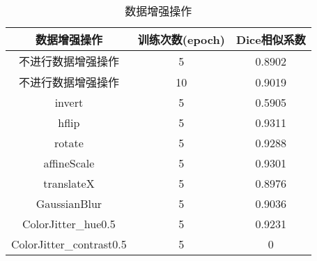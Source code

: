 \documentclass[AutoFakeBold]{LZUThesis}
\begin{document}
\begin{table}[htbp] %
    \setlength{\abovecaptionskip}{0cm}
    \setlength{\belowcaptionskip}{0.2cm}
    \centering
    \caption{数据增强操作}
    \label{tab:l1}
    \begin{tabular}{|c|c|c|}
        \hline
        数据增强操作             & 训练次数(epoch) & Dice相似系数 \\
        \hline
        不进行数据增强操作       & 5               & 0.8902       \\
        \hline
        不进行数据增强操作       & 10              & 0.9019       \\
        \hline
        invert                   & 5               & 0.5905       \\
        \hline
        hflip                    & 5               & 0.9311       \\
        \hline
        rotate                   & 5               & 0.9288       \\
        \hline
        affineScale              & 5               & 0.9301       \\
        \hline
        translateX               & 5               & 0.8976       \\
        \hline
        GaussianBlur             & 5               & 0.9036       \\
        \hline
        ColorJitter\_hue0.5      & 5               & 0.9231       \\
        \hline
        ColorJitter\_contrast0.5 & 5               & 0            \\
        \hline
    \end{tabular}
\end{table}
\printbib
\end{document}
